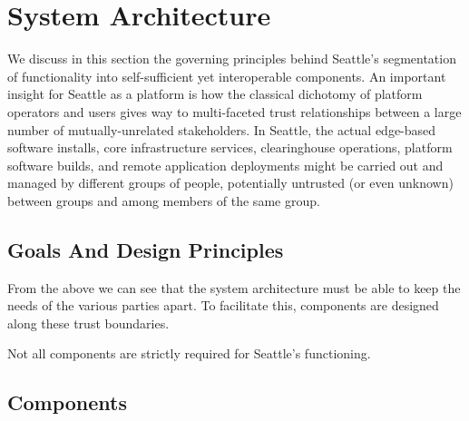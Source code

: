 \section{System Architecture}

We discuss in this section the governing principles behind Seattle's
segmentation of functionality into self-sufficient yet interoperable
components.
An important insight for Seattle as a platform is how the classical
dichotomy of platform operators and users gives way to multi-faceted
trust relationships between a large number of mutually-unrelated
stakeholders.
In Seattle, the actual edge-based software installs, core infrastructure
services, clearinghouse operations, platform software builds, and remote
application deployments might be carried out and managed by different
groups of people, potentially untrusted (or even unknown) between groups
and among members of the same group.


\subsection{Goals And Design Principles}

From the above we can see that the system architecture must be able
to keep the needs of the various parties apart. To facilitate this,
components are designed along these trust boundaries.

Not all components are strictly required for Seattle's functioning.







\subsection{Components}

